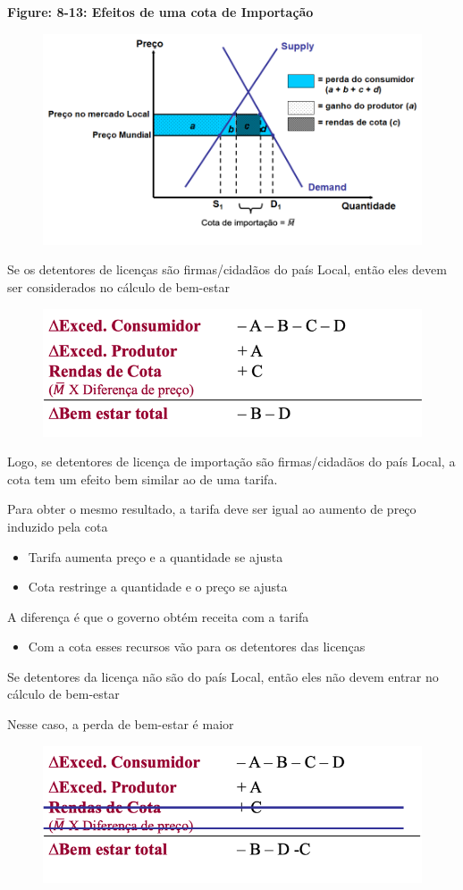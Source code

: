 \documentclass[a4paper,12pt]{article}[abntex2]
\begin{document}
\textbf{Figure: 8-13: Efeitos de uma cota de Importação}
\begin{figure}[H]
    \centering
    \includegraphics[width=0.7\linewidth]{Imagens/a21i1.png}
\end{figure}

Se os detentores de licenças são firmas/cidadãos do país Local, então eles devem ser considerados no cálculo de bem-estar
\begin{figure}[H]
    \centering
    \includegraphics[width=0.75\linewidth]{Imagens/a21i2.png}
\end{figure}

Logo, se detentores de licença de importação são firmas/cidadãos do país Local, a cota tem um efeito bem similar ao de uma tarifa.

Para obter o mesmo resultado, a tarifa deve ser igual ao aumento de preço induzido pela cota
\begin{itemize}
  \item Tarifa aumenta preço e a quantidade se ajusta
  \item Cota restringe a quantidade e o preço se ajusta
\end{itemize}

A diferença é que o governo obtém receita com a tarifa
\begin{itemize}
  \item Com a cota esses recursos vão para os detentores das licenças
\end{itemize}

Se detentores da licença não são do país Local, então eles não devem entrar no cálculo de bem-estar

Nesse caso, a perda de bem-estar é maior
\begin{figure}[H]
    \centering
    \includegraphics[width=0.7\linewidth]{Imagens/a21i3.png}
\end{figure}
\end{document}
